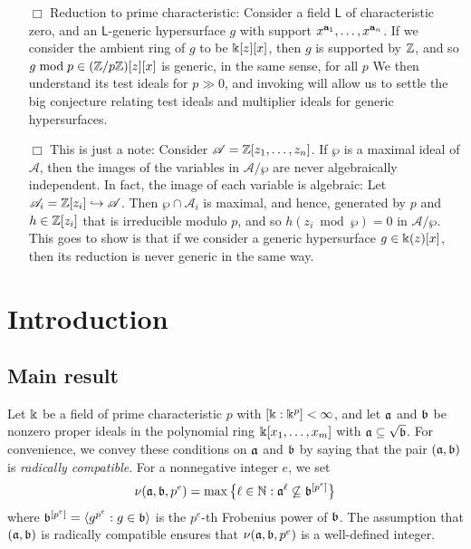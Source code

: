 \documentclass{amsart}
\begin{document}
{\begin{enumerate}
 \item[$\Box$] Reduction to prime characteristic:  Consider a field $\mathsf{L}$ of characteristic zero, and an $\mathsf{L}$-generic hypersurface $g$ with support $x^{\mathbf{a}_1}, \ldots, x^{\mathbf{a}_n}$.  If we consider the ambient ring of $g$ to be $\Bbbk[z][x]$, then $g$ is supported by $\mathbb{Z}$, and so $g \bmod p \in (\mathbb{Z}/p\mathbb{Z})[z][x]$ is generic, in the same sense, for all $p$ We then understand its test ideals for $p \gg 0$, and invoking  will allow us to settle the big conjecture relating test ideals and multiplier ideals for generic hypersurfaces.
 \item[$\Box$]  This is just a note: Consider $\mathscr{A} = \mathbb{Z}[z_1, \ldots, z_n]$.  If $\wp$ is a maximal ideal of $\mathscr{A}$, then the images of the variables in $\mathscr{A}/\wp$ are never algebraically independent.  In fact, the image of each variable is algebraic:  Let $\mathscr{A}_i= \mathbb{Z}[z_i] \hookrightarrow \mathscr{A}$.  Then $\wp \cap \mathscr{A}_i$ is maximal, and hence, generated by $p$ and $h \in \mathbb{Z}[z_i]$ that is irreducible modulo $p$, and so $h(z_i \bmod \wp) = 0$ in $\mathscr{A}/\wp$.  This goes to show is that if we consider a generic hypersurface $g \in \Bbbk(z)[x]$, then its reduction is never generic in the same way.  
\end{enumerate}
}

\setcounter{tocdepth}{1}
\tableofcontents

\section{Introduction}

\subsection{Main result}

Let $\Bbbk$ be a field of prime characteristic $p$ with $[\Bbbk:\Bbbk^p] < \infty$, and let $\mathfrak{a}$ and $\mathfrak{b}$ be nonzero proper ideals in the polynomial ring $\Bbbk[x_1,\ldots,x_m]$ with $\mathfrak{a} \subseteq \sqrt {\mathfrak{b}}$.
For convenience, we convey these conditions on $\mathfrak{a}$ and $\mathfrak{b}$ by saying that the pair $(\mathfrak{a},\mathfrak{b})$ is \emph{radically compatible}.
For a nonnegative integer $e$, we set
\begin{equation}
   \nu(\mathfrak{a},\mathfrak{b},p^e) = \max\big\{\ell\in \mathbb{N} : \mathfrak{a}^{\ell} \not\subseteq \mathfrak{b}^{[p^e]}\big\}
   \label{eq: nu definition}
\end{equation}
where $\mathfrak{b}^{[p^e]} = \langle g^{p^e} : g \in \mathfrak{b} \rangle$ is the $p^e$-th Frobenius power of $\mathfrak{b}$.
The assumption that $(\mathfrak{a}, \mathfrak{b})$ is radically compatible ensures that $\nu(\mathfrak{a}, \mathfrak{b}, p^e)$ is a well-defined integer.
\end{document}
